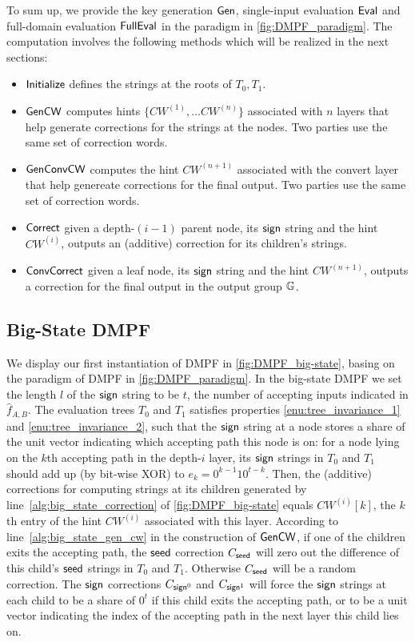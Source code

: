 To sum up, we provide the key generation ${\sf Gen}$, single-input evaluation ${\sf Eval}$ and full-domain evaluation ${\sf FullEval}$ in the paradigm in \cref{fig:DMPF_paradigm}. The computation involves the following methods which will be realized in the next sections: 
\begin{itemize}
  \item $\sf Initialize$ defines the strings at the roots of $T_0,T_1$.
  \item $\sf GenCW$ computes hints $\{CW^{(1)},\dots CW^{(n)}\}$ associated with $n$ layers that help generate corrections for the strings at the nodes. Two parties use the same set of correction words. 
  \item $\sf GenConvCW$ computes the hint $CW^{(n+1)}$ associated with the convert layer that help genereate corrections for the final output. Two parties use the same set of correction words. 
  \item $\sf Correct$ given a depth-$(i-1)$ parent node, its ${\sf sign}$ string and the hint $CW^{(i)}$, outputs an (additive) correction for its children's strings. 
  \item $\sf ConvCorrect$ given a leaf node, its ${\sf sign}$ string and the hint $CW^{(n+1)}$, outputs a correction for the final output in the output group $\mathbb{G}$. 
\end{itemize}


\subsection{Big-State DMPF}\label{sec:big_state_DMPF}
We display our first instantiation of DMPF in \cref{fig:DMPF_big-state}, basing on the paradigm of DMPF in \cref{fig:DMPF_paradigm}. In the big-state DMPF we set the length $l$ of the ${\sf sign}$ string to be $t$, the number of accepting inputs indicated in $\hat{f}_{A,B}$. The evaluation trees $T_0$ and $T_1$ satisfies properties \ref{enu:tree_invariance_1} and \ref{enu:tree_invariance_2}, such that the ${\sf sign}$ string at a node stores a share of the unit vector indicating which accepting path this node is on: for a node lying on the $k$th accepting path in the depth-$i$ layer, its ${\sf sign}$ strings in $T_0$ and $T_1$ should add up (by bit-wise XOR) to $e_k = 0^{k-1}10^{t-k}$. Then, the (additive) corrections for computing strings at its children generated by line~\ref{alg:big_state_correction} of \cref{fig:DMPF_big-state} equals $CW^{(i)}[k]$, the $k$th entry of the hint $CW^{(i)}$ associated with this layer. According to line~\ref{alg:big_state_gen_cw} in the construction of $\sf GenCW$, if one of the children exits the accepting path, the ${\sf seed}$ correction $C_{\sf seed}$ will zero out the difference of this child's ${\sf seed}$ strings in $T_0$ and $T_1$. Otherwise $C_{\sf seed}$ will be a random correction. The ${\sf sign}$ corrections $C_{{\sf sign}^0}$ and $C_{{\sf sign}^1}$ will force the ${\sf sign}$ strings at each child to be a share of $0^t$ if this child exits the accepting path, or to be a unit vector indicating the index of the accepting path in the next layer this child lies on. 

